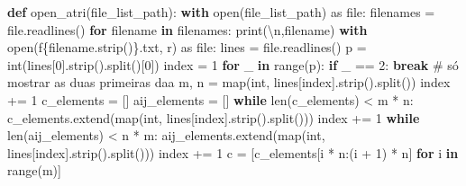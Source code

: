 \documentclass[
  letterpaper,
  DIV=11,
  numbers=noendperiod]{scrartcl}
\newenvironment{Shaded}{\begin{snugshade}}{\end{snugshade}}
\newcommand{\BuiltInTok}[1]{\textcolor[rgb]{0.00,0.23,0.31}{#1}}
\newcommand{\CharTok}[1]{\textcolor[rgb]{0.13,0.47,0.30}{#1}}
\newcommand{\CommentTok}[1]{\textcolor[rgb]{0.37,0.37,0.37}{#1}}
\newcommand{\ControlFlowTok}[1]{\textcolor[rgb]{0.00,0.23,0.31}{\textbf{#1}}}
\newcommand{\DecValTok}[1]{\textcolor[rgb]{0.68,0.00,0.00}{#1}}
\newcommand{\ImportTok}[1]{\textcolor[rgb]{0.00,0.46,0.62}{#1}}
\newcommand{\KeywordTok}[1]{\textcolor[rgb]{0.00,0.23,0.31}{\textbf{#1}}}
\newcommand{\NormalTok}[1]{\textcolor[rgb]{0.00,0.23,0.31}{#1}}
\newcommand{\OperatorTok}[1]{\textcolor[rgb]{0.37,0.37,0.37}{#1}}
\newcommand{\SpecialCharTok}[1]{\textcolor[rgb]{0.37,0.37,0.37}{#1}}
\newcommand{\SpecialStringTok}[1]{\textcolor[rgb]{0.13,0.47,0.30}{#1}}
\newcommand{\StringTok}[1]{\textcolor[rgb]{0.13,0.47,0.30}{#1}}
\begin{document}
\begin{Shaded}
\begin{Highlighting}[]
\KeywordTok{def}\NormalTok{ open\_atri(file\_list\_path):}
    \ControlFlowTok{with} \BuiltInTok{open}\NormalTok{(file\_list\_path) }\ImportTok{as} \BuiltInTok{file}\NormalTok{:}
\NormalTok{        filenames }\OperatorTok{=} \BuiltInTok{file}\NormalTok{.readlines()}
    \ControlFlowTok{for}\NormalTok{ filename }\KeywordTok{in}\NormalTok{ filenames:}
        \BuiltInTok{print}\NormalTok{(}\StringTok{\textquotesingle{}}\CharTok{\textbackslash{}n}\StringTok{\textquotesingle{}}\NormalTok{,filename)}
        \ControlFlowTok{with} \BuiltInTok{open}\NormalTok{(}\SpecialStringTok{f\textquotesingle{}}\SpecialCharTok{\{}\NormalTok{filename}\SpecialCharTok{.}\NormalTok{strip()}\SpecialCharTok{\}}\SpecialStringTok{.txt\textquotesingle{}}\NormalTok{, }\StringTok{\textquotesingle{}r\textquotesingle{}}\NormalTok{) }\ImportTok{as} \BuiltInTok{file}\NormalTok{:}
\NormalTok{            lines }\OperatorTok{=} \BuiltInTok{file}\NormalTok{.readlines()}
\NormalTok{        p }\OperatorTok{=} \BuiltInTok{int}\NormalTok{(lines[}\DecValTok{0}\NormalTok{].strip().split()[}\DecValTok{0}\NormalTok{])}
\NormalTok{        index }\OperatorTok{=} \DecValTok{1}
        \ControlFlowTok{for}\NormalTok{ \_ }\KeywordTok{in} \BuiltInTok{range}\NormalTok{(p):}
            \ControlFlowTok{if}\NormalTok{ \_ }\OperatorTok{==} \DecValTok{2}\NormalTok{: }\ControlFlowTok{break} \CommentTok{\# só mostrar as duas primeiras daa}
\NormalTok{            m, n }\OperatorTok{=} \BuiltInTok{map}\NormalTok{(}\BuiltInTok{int}\NormalTok{, lines[index].strip().split())}
\NormalTok{            index }\OperatorTok{+=} \DecValTok{1}
\NormalTok{            c\_elements }\OperatorTok{=}\NormalTok{ []}
\NormalTok{            aij\_elements }\OperatorTok{=}\NormalTok{ []}
            \ControlFlowTok{while} \BuiltInTok{len}\NormalTok{(c\_elements) }\OperatorTok{\textless{}}\NormalTok{ m }\OperatorTok{*}\NormalTok{ n:}
\NormalTok{                c\_elements.extend(}\BuiltInTok{map}\NormalTok{(}\BuiltInTok{int}\NormalTok{, lines[index].strip().split()))}
\NormalTok{                index }\OperatorTok{+=} \DecValTok{1}
            \ControlFlowTok{while} \BuiltInTok{len}\NormalTok{(aij\_elements) }\OperatorTok{\textless{}}\NormalTok{ n }\OperatorTok{*}\NormalTok{ m:}
\NormalTok{                aij\_elements.extend(}\BuiltInTok{map}\NormalTok{(}\BuiltInTok{int}\NormalTok{, lines[index].strip().split()))}
\NormalTok{                index }\OperatorTok{+=} \DecValTok{1}
\NormalTok{            c }\OperatorTok{=}\NormalTok{ [c\_elements[i }\OperatorTok{*}\NormalTok{ n:(i }\OperatorTok{+} \DecValTok{1}\NormalTok{) }\OperatorTok{*}\NormalTok{ n] }\ControlFlowTok{for}\NormalTok{ i }\KeywordTok{in} \BuiltInTok{range}\NormalTok{(m)]}

\end{Highlighting}
\end{Shaded}
\end{document}
